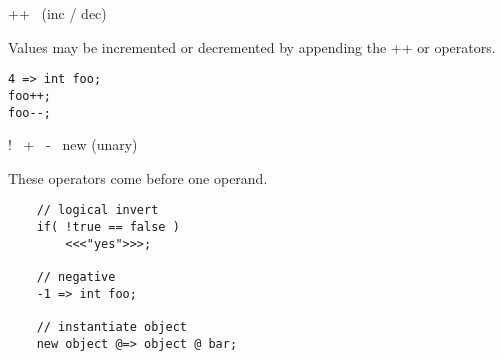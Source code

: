 ++~ \doubledash (inc / dec)

Values may be incremented or decremented by appending the ++ or \doubledash operators.
\begin{verbatim}
4 => int foo;
foo++;
foo--;
\end{verbatim}

!~ +~ -~ new (unary)

These operators come before one operand.
\begin{verbatim}
    // logical invert
    if( !true == false )
        <<<"yes">>>;

    // negative
    -1 => int foo;

    // instantiate object
    new object @=> object @ bar;
\end{verbatim}
